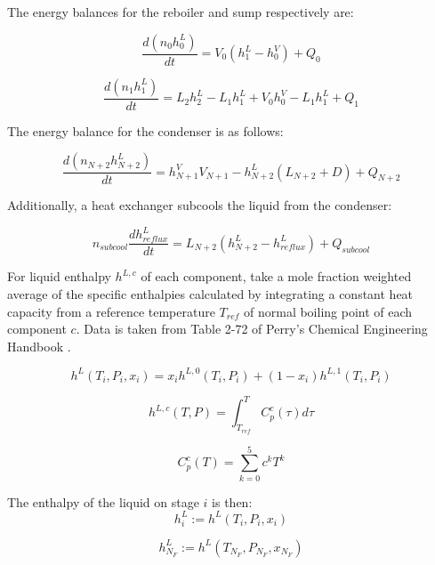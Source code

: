  The energy balances for the reboiler and sump respectively are:

\begin{equation}
    \frac{d(n_0h^L_0)}{dt} = V_0(h^L_{1} - h^V_0) + Q_0
\end{equation}

\begin{equation}
    \frac{d(n_1h^L_1)}{dt} = L_2 h^L_2 - L_1 h^L_1 + V_0 h^V_0 - L_1 h^L_1 + Q_1  
\end{equation}

The energy balance for the condenser is as follows:

\begin{equation}
    \frac{d(n_{N+2}h^L_{N+2})}{dt} = h^V_{N+1} V_{N+1}-h^L_{N+2}(L_{N+2} + D) + Q_{N+2}
\end{equation}

Additionally, a heat exchanger subcools the liquid from the condenser:

\begin{equation}
    n_{subcool}\frac{d h^L_{reflux}}{dt} = L_{N+2}(h^L_{N+2} - h^L_{reflux}) + Q_{subcool}
\end{equation}

For liquid enthalpy $h^{L,c}$ of each component, take a mole fraction weighted average of the specific enthalpies calculated by integrating a constant heat capacity from a reference temperature $T_{ref}$ of normal boiling point of each component $c$. Data is taken from Table 2-72 of Perry’s Chemical Engineering Handbook \cite{Perrys2018}.

\begin{equation}
    h^L(T_i, P_i, x_i) = x_ih^{L,0}(T_i,P_i) + (1-x_i)h^{L,1}(T_i,P_i)
\end{equation}

\begin{equation}
    h^{L,c}(T,P) = \int_{T_{ref}}^T C_p^c(\tau)d\tau 
\end{equation}

\begin{equation}
    C_p^c(T) = \sum_{k=0}^5 c^kT^k 
\end{equation}

The enthalpy of the liquid on stage $i$ is then:
\begin{equation}
    h^L_i := h^L(T_i, P_i,x_i)
\end{equation}

\begin{equation}
    h^L_{N_F} := h^L(T_{N_F}, P_{N_F},x_{N_F})
\end{equation}

